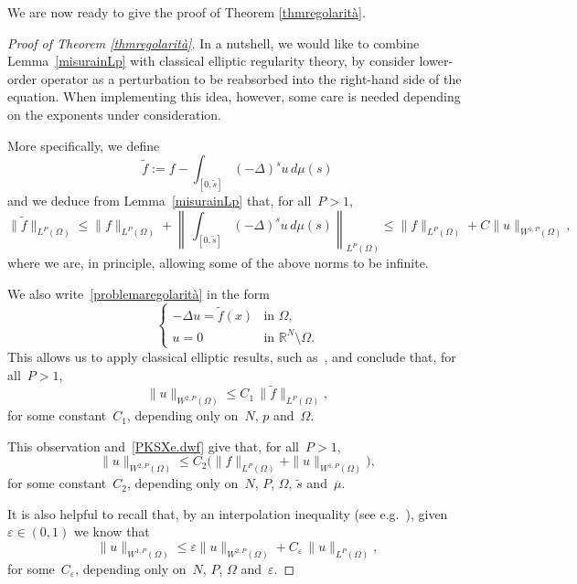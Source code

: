 \documentclass[12pt,a4paper,intlimits,sumlimits]{amsart}
\def \R {\mathbb{R}}
\theoremstyle{definition}
\theoremstyle{plain}
\numberwithin{equation}{section}
\newcommand{\e}{\varepsilon}
\renewcommand{\leq}{\leqslant}
\renewcommand{\le}{\leqslant}
\begin{document}
We are now ready to give the proof of Theorem \ref{thmregolarità}.

\begin{proof}[Proof of Theorem \ref{thmregolarità}] In a nutshell, we would like to combine
Lemma~\ref{misurainLp} with classical elliptic regularity theory,
by consider lower-order operator as a perturbation to be reabsorbed into
the right-hand side of the equation. When implementing this idea, however,
some care is needed depending on the exponents under consideration.

More specifically, we define
$$ \widetilde f:=f-\int_{[0,\widetilde s]}(-\Delta)^s u\,d\mu(s)$$
and we deduce from Lemma~\ref{misurainLp} that, for all~$P>1$,
\begin{equation}\label{PKSXe.dwf}
\|\widetilde f\|_{L^P(\Omega)}\le\|f\|_{L^P(\Omega)}
+
\left\|\,\int_{[0,\widetilde s]}(-\Delta)^s u\,d\mu(s) \right\|_{L^P(\Omega)}\leq \|f\|_{L^P(\Omega)}+C\|u\|_{W^{1,P}(\Omega)},\end{equation}
where we are, in principle, allowing some of the above norms to be infinite.

We also write~\eqref{problemaregolarità} in the form
\begin{equation*}
\begin{cases}
-\Delta u 
=\widetilde f(x) & \mbox{in } \Omega,
\\
u=0  & \mbox{in } \R^N\setminus \Omega.
\end{cases}
\end{equation*}
This allows us to apply classical elliptic results, such as~\cite[Theorem 5.3.5]{MR4784613}, and conclude that,
for all~$P>1$,
\begin{equation*}
\|u\|_{W^{2,P}(\Omega)}\leq C_1\,\|\widetilde f\|_{L^P(\Omega)},
\end{equation*}
for some constant~$C_1$, depending only on~$N$, $p$ and~$\Omega$.

This observation and~\eqref{PKSXe.dwf} give that, for all~$P>1$,
\begin{equation}\label{bg-92X4cv0 6m}
\|u\|_{W^{2,P}(\Omega)}\leq C_2\Big(
\|f\|_{L^P(\Omega)}+\|u\|_{W^{1,P}(\Omega)}\Big),
\end{equation}
for some constant~$C_2$, depending only on~$N$, $P$, $\Omega$,
$\widetilde s$ and~$\overline\mu$.

It is also helpful to recall that,
by an interpolation inequality (see e.g.~\cite[equation~(5.2.54)]{MR4784613}), given~$\e\in(0,1)$ we know that
\begin{equation}\label{INY} \|u\|_{W^{1,P}(\Omega)}\le \e\|u\|_{W^{2,P}(\Omega)}+C_\e\,\|u\|_{L^{P}(\Omega)},\end{equation}
for some~$C_\e$, depending only on~$N$, $P$, $\Omega$ and~$\e$.\bigskip


\end{proof}
\end{document}
